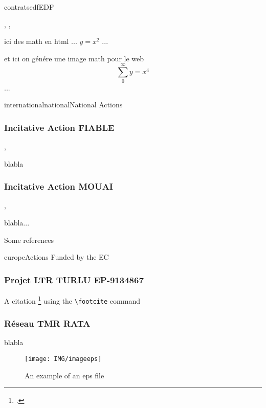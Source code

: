 \documentclass{ra2013}
\begin{document}
\begin{module}{contrats}{edf}{EDF}
\begin{participants}
, 
,
\end{participants}
ici des math en html 
... $y=x^2$ ...

et ici on génére une image math pour le web  
\begin{displaymath}
\sum_{0}^{\infty} y = x^4
\end{displaymath}
...

\end{module}



\begin{module}{international}{national}{National Actions}

\subsubsection{Incitative Action  FIABLE}
\begin{participants}
,
\end{participants}

blabla

\subsubsection{Incitative Action  MOUAI}
\begin{participants}
, 
\end{participants}

blabla...

Some references 

\end{module}


\begin{module}{}{europe}{Actions Funded by the EC}
\subsubsection{Projet LTR TURLU EP-9134867}
A citation \footcite{MB07} using the \verb=\footcite= command
\subsubsection{Réseau TMR RATA}
blabla

\begin{figure}
\begin{center}
\texttt{[image: IMG/imageeps]}
\end{center}
\caption{An example of an eps file}
\label{fig:completemap}
\end{figure}


\end{module}
\end{document}

